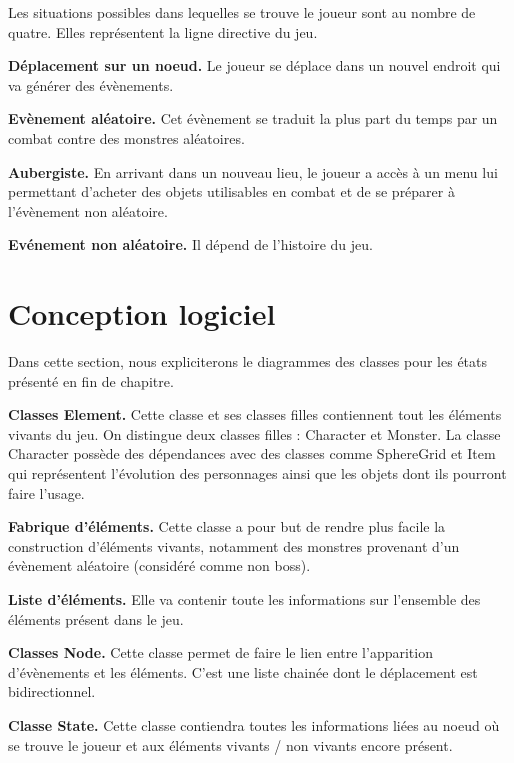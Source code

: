 \documentclass[12pt,a4paper]{report}
\begin{document}
Les situations possibles dans lequelles se trouve le joueur sont au nombre de quatre. Elles repr\'{e}sentent la ligne directive du jeu.

\textbf{D\'{e}placement sur un noeud.} Le joueur se d\'{e}place dans un nouvel endroit qui va g\'{e}n\'{e}rer des \'{e}v\`{e}nements. 

\textbf{Ev\`{e}nement al\'{e}atoire.} Cet \'{e}v\`{e}nement se traduit la plus part du temps par un combat contre des monstres al\'{e}atoires.

\textbf{Aubergiste.} En arrivant dans un nouveau lieu, le joueur a acc\`{e}s \`{a} un menu lui permettant d'acheter des objets utilisables en combat et de se pr\'{e}parer \`{a} l'\'{e}v\`{e}nement non al\'{e}atoire.

\textbf{Ev\'{e}nement non al\'{e}atoire.} Il d\'{e}pend de l'histoire du jeu.

\newpage

\section{Conception logiciel}

Dans cette section, nous expliciterons le diagrammes des classes pour les \'{e}tats pr\'{e}sent\'{e} en fin de chapitre. 

\textbf{Classes Element.} Cette classe et ses classes filles contiennent tout les \'{e}l\'{e}ments vivants du jeu. On distingue deux classes filles : Character et Monster. La classe Character possède des dépendances avec des classes comme SphereGrid et Item qui représentent l'\'{e}volution des personnages ainsi que les objets dont ils pourront faire l'usage. 

\textbf{Fabrique d'\'{e}l\'{e}ments.} Cette classe a pour but de rendre plus facile la construction d'\'{e}l\'{e}ments vivants, notamment des monstres provenant d'un \'{e}v\`{e}nement al\'{e}atoire (consid\'{e}r\'{e} comme non boss).

\textbf{Liste d'\'{e}l\'{e}ments.} Elle va contenir toute les informations sur l'ensemble des \'{e}l\'{e}ments pr\'{e}sent dans le jeu. 

\textbf{Classes Node.} Cette classe permet de faire le lien entre l'apparition d'\'{e}v\`{e}nements et les \'{e}l\'{e}ments. C'est une liste chain\'{e}e dont le d\'{e}placement est bidirectionnel. 

\textbf{Classe State.} Cette classe contiendra toutes les informations li\'{e}es au noeud o\`{u} se trouve le joueur et aux \'{e}l\'{e}ments vivants / non vivants encore pr\'{e}sent.
\end{document}
